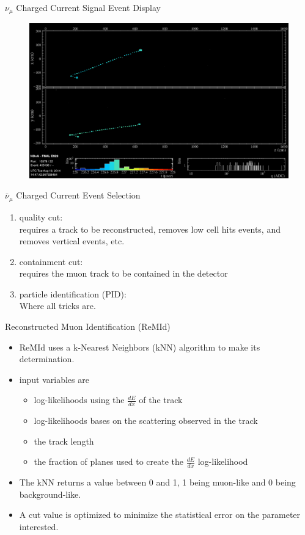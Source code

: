 \documentclass{beamer}
\begin{document}
\begin{frame}{$\nu_\mu$ Charged Current Signal Event Display}
\begin{figure}
\centering
\includegraphics[width=\textwidth]{figures/numucc_signal.png}
\end{figure}
\end{frame}

\begin{frame}{$\bar{\nu}_\mu$ Charged Current Event Selection}
\begin{enumerate}
  \item quality cut:\\
  requires a track to be reconstructed, removes low cell hits events, and removes vertical events, etc.
  \item containment cut:\\
  requires the muon track to be contained in the detector
  \item particle identification (PID):\\
  Where all tricks are.
\end{enumerate}
\end{frame}

\begin{frame}{Reconstructed Muon Identification (ReMId)}
\begin{itemize}
  \item ReMId uses a k-Nearest Neighbors (kNN) algorithm to make its determination.
  \item input variables are
  \begin{itemize}
    \item log-likelihoods using the $\frac{dE}{dx}$ of the track
    \item log-likelihoods bases on the scattering observed in the track
    \item the track length
    \item the fraction of planes used to create the $\frac{dE}{dx}$ log-likelihood
  \end{itemize}
  \item The kNN returns a value between 0 and 1, 1 being muon-like and 0 being background-like.
  \item A cut value is optimized to minimize the statistical error on the parameter interested.
\end{itemize}
\end{frame}
\end{document}
